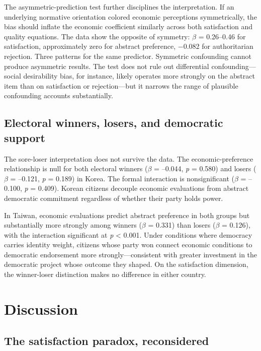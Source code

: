 \documentclass[
  12pt,
  12pt,
  letterpaper]{article}
\begin{document}
The asymmetric-prediction test further disciplines the interpretation.
If an underlying normative orientation colored economic perceptions
symmetrically, the bias should inflate the economic coefficient
similarly across both satisfaction and quality equations. The data show
the opposite of symmetry: \(\beta\) = 0.26--0.46 for satisfaction,
approximately zero for abstract preference, −0.082 for authoritarian
rejection. Three patterns for the same predictor. Symmetric confounding
cannot produce asymmetric results. The test does not rule out
differential confounding---social desirability bias, for instance,
likely operates more strongly on the abstract item than on satisfaction
or rejection---but it narrows the range of plausible confounding
accounts substantially.

\subsection{Electoral winners, losers, and democratic
support}\label{electoral-winners-losers-and-democratic-support}

The sore-loser interpretation does not survive the data. The
economic-preference relationship is null for both electoral winners
(\(\beta\) = --0.044, \emph{p} = 0.580) and losers (\(\beta\) = --0.121,
\emph{p} = 0.189) in Korea. The formal interaction is nonsignificant
(\(\beta\) = --0.100, \emph{p} = 0.409). Korean citizens decouple
economic evaluations from abstract democratic commitment regardless of
whether their party holds power.

In Taiwan, economic evaluations predict abstract preference in both
groups but substantially more strongly among winners (\(\beta\) = 0.331)
than losers (\(\beta\) = 0.126), with the interaction significant at
\emph{p} \textless{} 0.001. Under conditions where democracy carries
identity weight, citizens whose party won connect economic conditions to
democratic endorsement more strongly---consistent with greater
investment in the democratic project whose outcome they shaped. On the
satisfaction dimension, the winner-loser distinction makes no difference
in either country.

\section{Discussion}\label{discussion}

\subsection{The satisfaction paradox,
reconsidered}\label{the-satisfaction-paradox-reconsidered}
\end{document}
